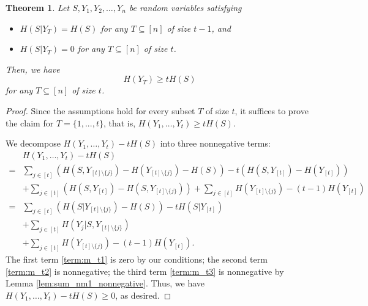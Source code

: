 \documentclass[11pt]{article}
\newtheorem{theorem}{Theorem}
\newcommand{\cond}{|}
\begin{document}
 \begin{theorem}
 \label{thm:m}
 Let $S, Y_1, Y_2, \ldots, Y_n$ be random variables satisfying
 \begin{itemize}
 	\item $H(S \cond Y_T) = H(S)$ for any $T \subseteq [n]$ of size $t-1$, and
 	\item $H(S \cond Y_T) = 0$ for any $T \subseteq [n]$ of size $t$.
 \end{itemize}
 Then, we have
 \[
 H(Y_T) \ge t H(S)
 \]
 for any $T \subseteq [n]$ of size $t$.	
 \end{theorem}
 \begin{proof}
 Since the assumptions hold for every subset $T$ of size $t$, it suffices to prove the claim for $T = \{1,...,t\}$, that is, $H(Y_1, \ldots, Y_t) \ge t H(S)$. 

 We decompose $H(Y_1, \ldots, Y_t) - t H(S)$ into three nonnegative terms:
 \begin{align}
  & H(Y_1, \ldots, Y_t) - t H(S)  \nonumber\\
  = & \sum_{j \in [t]} \left( H(S, Y_{[t] \setminus \{j\}}) - H(Y_{[t] \setminus \{j\}}) - H(S) \right) - t\left( H(S, Y_{[t]}) - H(Y_{[t]})\right) \nonumber \\
  & + \sum_{j \in [t]} \left( H(S, Y_{[t]}) - H(S, Y_{[t] \setminus \{j\}}) \right)  + \sum_{j \in [t]} H(Y_{[t] \setminus \{j\}}) - (t-1)H(Y_{[t]}) \nonumber \\
  = & \sum_{j \in [t]} \left( H(S \cond Y_{[t] \setminus \{j\}}) - H(S) \right) - t H(S \cond Y_{[t]}) \label{term:m_t1} \\
  & + \sum_{j \in [t]} H(Y_j \cond S, Y_{[t] \setminus \{j\}}) \label{term:m_t2} \\
  & + \sum_{j \in [t]} H(Y_{[t] \setminus \{j\}}) - (t-1) H(Y_{[t]}). \label{term:m_t3}
 \end{align}
 The first term \eqref{term:m_t1} is zero by our conditions; the second term \eqref{term:m_t2} is  nonnegative; the third term \eqref{term:m_t3} is nonnegative by Lemma \ref{lem:sum_nm1_nonnegative}.
 Thus, we have $H(Y_1, \ldots, Y_t) - t H(S) \ge 0$, as desired.
 \end{proof}
 
\end{document}
